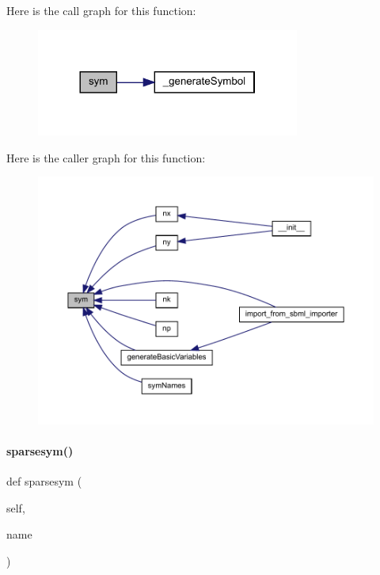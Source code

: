Here is the call graph for this function\+:
\nopagebreak
\begin{figure}[H]
\begin{center}
\leavevmode
\includegraphics[width=245pt]{classamici_1_1ode__export_1_1_o_d_e_model_a47906a8f4c249a513f4d6ca7c12d2304_cgraph}
\end{center}
\end{figure}
Here is the caller graph for this function\+:
\nopagebreak
\begin{figure}[H]
\begin{center}
\leavevmode
\includegraphics[width=350pt]{classamici_1_1ode__export_1_1_o_d_e_model_a47906a8f4c249a513f4d6ca7c12d2304_icgraph}
\end{center}
\end{figure}
\mbox{\label{classamici_1_1ode__export_1_1_o_d_e_model_a0a1d830b8c4d1e208e81f48dfea71cf4}} 
\paragraph{\texorpdfstring{sparsesym()}{sparsesym()}}
{\footnotesize\ttfamily def sparsesym (\begin{DoxyParamCaption}\item[{}]{self,  }\item[{}]{name }\end{DoxyParamCaption})}


